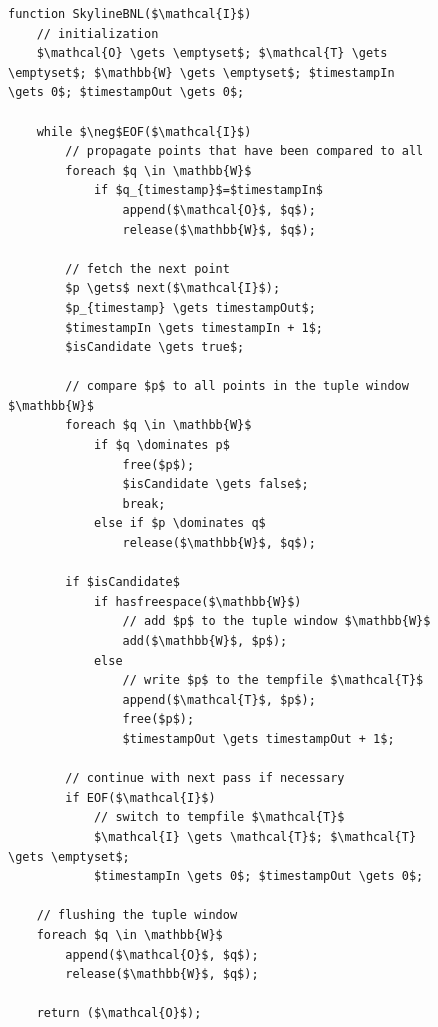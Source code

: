 \begin{figure}[htbp]
\begin{lstlisting}[language=pseudo, 
caption={Original Block-Nested-Loops (BNL) Algorithm, which does not terminate in all cases},
label={code:bnl}]
function SkylineBNL($\mathcal{I}$)
	// initialization
	$\mathcal{O} \gets \emptyset$; $\mathcal{T} \gets \emptyset$; $\mathbb{W} \gets \emptyset$; $timestampIn \gets 0$; $timestampOut \gets 0$;

	while $\neg$EOF($\mathcal{I}$)
		// propagate points that have been compared to all
		foreach $q \in \mathbb{W}$
			if $q_{timestamp}$=$timestampIn$
				append($\mathcal{O}$, $q$);
				release($\mathbb{W}$, $q$);

		// fetch the next point
		$p \gets$ next($\mathcal{I}$);
		$p_{timestamp} \gets timestampOut$;
		$timestampIn \gets timestampIn + 1$;
		$isCandidate \gets true$;

		// compare $p$ to all points in the tuple window $\mathbb{W}$
		foreach $q \in \mathbb{W}$
			if $q \dominates p$
				free($p$);
				$isCandidate \gets false$;
				break;
			else if $p \dominates q$
				release($\mathbb{W}$, $q$);

		if $isCandidate$
			if hasfreespace($\mathbb{W}$)
				// add $p$ to the tuple window $\mathbb{W}$
				add($\mathbb{W}$, $p$);
			else
				// write $p$ to the tempfile $\mathcal{T}$
				append($\mathcal{T}$, $p$);
				free($p$);
				$timestampOut \gets timestampOut + 1$;

		// continue with next pass if necessary
		if EOF($\mathcal{I}$)
			// switch to tempfile $\mathcal{T}$
			$\mathcal{I} \gets \mathcal{T}$; $\mathcal{T} \gets \emptyset$;
			$timestampIn \gets 0$; $timestampOut \gets 0$;

	// flushing the tuple window
	foreach $q \in \mathbb{W}$
		append($\mathcal{O}$, $q$);
		release($\mathbb{W}$, $q$);

	return ($\mathcal{O}$);
\end{lstlisting}
\vfill
\end{figure}


